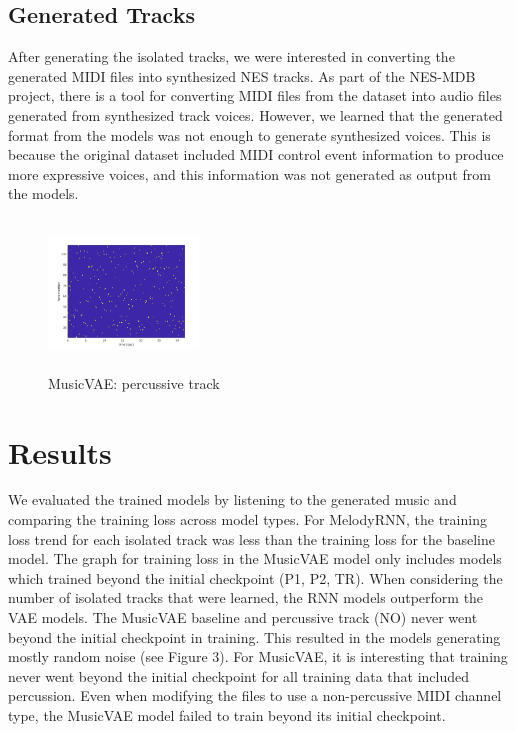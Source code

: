 \documentclass{article}
\begin{document}
\subsection{Generated Tracks}
After generating the isolated tracks, we were interested in converting the generated MIDI files into synthesized NES tracks. As part of the NES-MDB project, there is a tool for converting MIDI files from the dataset into audio files generated from synthesized track voices. However, we learned that the generated format from the models was not enough to generate synthesized voices. This is because the original dataset included MIDI control event information to produce more expressive voices, and this information was not generated as output from the models.

\begin{figure}[htb!]
  \begin{minipage}{1.0\textwidth}
    \centering
    \includegraphics[height=4cm, width=4cm]{img/vae_no.jpg}
    \caption{MusicVAE: percussive track}
  \end{minipage}
\end{figure}

\section{Results}


We evaluated the trained models by listening to the generated music and comparing the training loss across model types. For MelodyRNN, the training loss trend for each isolated track was less than the training loss for the baseline model. The graph for training loss in the MusicVAE model only includes models which trained beyond the initial checkpoint (P1, P2, TR). When considering the number of isolated tracks that were learned, the RNN models outperform the VAE models. The MusicVAE baseline and percussive track (NO) never went beyond the initial checkpoint in training. This resulted in the models generating mostly random noise (see Figure 3). For MusicVAE, it is interesting that training never went beyond the initial checkpoint for all training data that included percussion. Even when modifying the files to use a non-percussive MIDI channel type, the MusicVAE model failed to train beyond its initial checkpoint.
\end{document}
